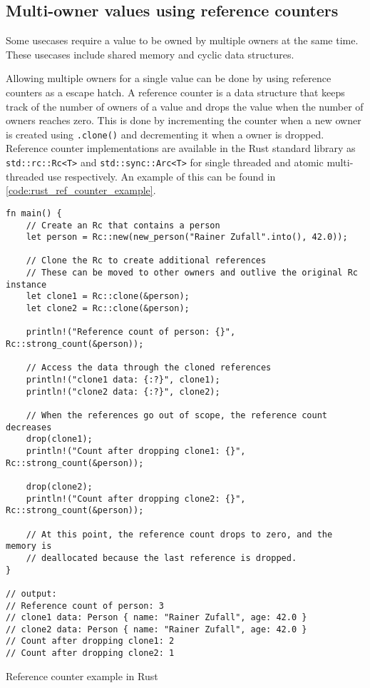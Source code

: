 
\subsection{Multi-owner values using reference counters}

Some usecases require a value to be owned by multiple owners at the same time.
These usecases include shared memory and cyclic data structures.

Allowing multiple owners for a single value can be done by using reference counters as a escape hatch.
A reference counter is a data structure that keeps track of the number of owners
of a value and drops the value when the number of owners reaches zero.
This is done by incrementing the counter when a new owner is created using \texttt{.clone()}
and decrementing it when a owner is dropped.
Reference counter implementations are available in the Rust standard library
as \texttt{std::rc::Rc<T>} and \texttt{std::sync::Arc<T>} for single threaded and atomic
multi-threaded use respectively.
An example of this can be found in \autoref{code:rust_ref_counter_example}.

\begin{listing}
    \begin{verbatim}
fn main() {
    // Create an Rc that contains a person
    let person = Rc::new(new_person("Rainer Zufall".into(), 42.0));

    // Clone the Rc to create additional references
    // These can be moved to other owners and outlive the original Rc instance
    let clone1 = Rc::clone(&person);
    let clone2 = Rc::clone(&person);

    println!("Reference count of person: {}", Rc::strong_count(&person));

    // Access the data through the cloned references
    println!("clone1 data: {:?}", clone1);
    println!("clone2 data: {:?}", clone2);

    // When the references go out of scope, the reference count decreases
    drop(clone1);
    println!("Count after dropping clone1: {}", Rc::strong_count(&person));

    drop(clone2);
    println!("Count after dropping clone2: {}", Rc::strong_count(&person));

    // At this point, the reference count drops to zero, and the memory is
    // deallocated because the last reference is dropped.
}

// output:
// Reference count of person: 3
// clone1 data: Person { name: "Rainer Zufall", age: 42.0 }
// clone2 data: Person { name: "Rainer Zufall", age: 42.0 }
// Count after dropping clone1: 2
// Count after dropping clone2: 1
    \end{verbatim}
    \caption{Reference counter example in Rust}
    \label{code:rust_ref_counter_example}
\end{listing}

